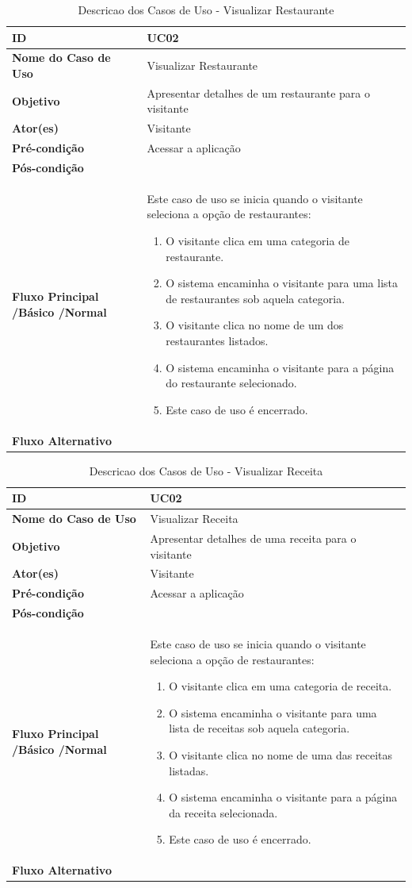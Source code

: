\begin{table}[H]
\begin{tabular}{| p{6cm} | p{10cm} |}
	\hline
	\textbf{ID} & UC02\tabularnewline
	\hline
	\hline
	\textbf{Nome do Caso de Uso} & Visualizar Restaurante\tabularnewline
	\hline
	\textbf{Objetivo} & Apresentar detalhes de um restaurante para o visitante\tabularnewline
	\hline
	\textbf{Ator(es)} & Visitante\tabularnewline
	\hline
	\textbf{Pré-condição} & Acessar a aplicação\tabularnewline
	\hline
	\textbf{Pós-condição} & \tabularnewline
	\hline
	\textbf{Fluxo Principal /Básico /Normal} & Este caso de uso se inicia quando o visitante seleciona a opção de restaurantes:
	\begin{enumerate}
		\item O visitante clica em uma categoria de restaurante.
		\item O sistema encaminha o visitante para uma lista de restaurantes sob aquela categoria.
		\item O visitante clica no nome de um dos restaurantes listados.
		\item O sistema encaminha o visitante para a página do restaurante selecionado.
		\item Este caso de uso é encerrado.
	\end{enumerate} \tabularnewline
	\hline
	\textbf{Fluxo Alternativo} & \tabularnewline
	\hline
\end{tabular}
\caption{Descricao dos Casos de Uso - Visualizar Restaurante}
\label{DCU_Vizualizar_Restaurante}
\end{table}


\begin{table}[H]
\begin{tabular}{| p{6cm} | p{10cm} |}
	\hline
	\textbf{ID} & UC02\tabularnewline
	\hline
	\hline
	\textbf{Nome do Caso de Uso} & Visualizar Receita\tabularnewline
	\hline
	\textbf{Objetivo} & Apresentar detalhes de uma receita para o visitante\tabularnewline
	\hline
	\textbf{Ator(es)} & Visitante\tabularnewline
	\hline
	\textbf{Pré-condição} & Acessar a aplicação\tabularnewline
	\hline
	\textbf{Pós-condição} & \tabularnewline
	\hline
	\textbf{Fluxo Principal /Básico /Normal} & Este caso de uso se inicia quando o visitante seleciona a opção de restaurantes:
	\begin{enumerate}
		\item O visitante clica em uma categoria de receita.
		\item O sistema encaminha o visitante para uma lista de receitas sob aquela categoria.
		\item O visitante clica no nome de uma das receitas listadas.
		\item O sistema encaminha o visitante para a página da receita selecionada.
		\item Este caso de uso é encerrado.
	\end{enumerate} \tabularnewline
	\hline
	\textbf{Fluxo Alternativo} & \tabularnewline
	\hline
\end{tabular}
\caption{Descricao dos Casos de Uso - Visualizar Receita}
\label{DCU_Visualizar_Receita}
\end{table}